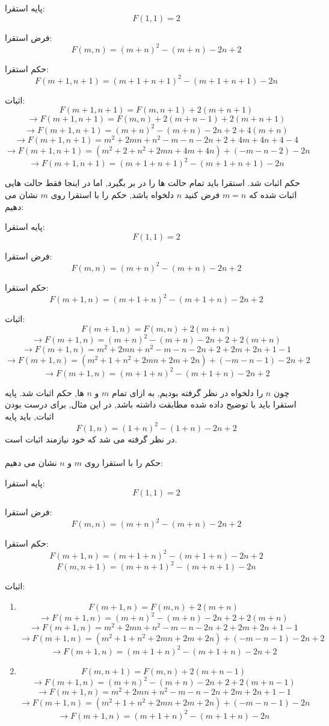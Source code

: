\documentclass[11pt,largemargins]{h2wp}
\begin{document}
پایه استقرا:
\[F(1,1)=2\]

فرض استقرا:
\[F(m,n)=(m+n)^2-(m+n)-2n+2\]

حکم استقرا:
\[F(m+1,n+1)=(m+1+n+1)^2-(m+1+n+1)-2n\]

اثبات:
\[F(m+1,n+1)=F(m,n+1)+2(m+n+1)\]
\[\rightarrow F(m+1,n+1)=F(m,n)+2(m+n-1)+2(m+n+1)\]
\[\rightarrow F(m+1,n+1)=(m+n)^2-(m+n)-2n+2+4(m+n)\]
\[\rightarrow F(m+1,n+1)=m^2+2mn+n^2-m-n-2n+2+4m+4n+4-4\]
\[\rightarrow F(m+1,n+1)=(m^2+2+n^2+2mn+4m+4n)+(-m-n-2)-2n\]
\[\rightarrow F(m+1,n+1)=(m+1+n+1)^2-(m+1+n+1)-2n\]

  حکم اثبات شد.
\notes
{}
استقرا باید تمام حالت ها را در بر بگیرد, اما در اینجا فقط حالت هایی اثبات شده که
$m=n$
\solution
فرض کنید $n$ دلخواه باشد, حکم را با استقرا روی $m$ نشان می دهیم:

پایه استقرا:
\[F(1,1)=2\]

فرض استقرا:
\[F(m,n)=(m+n)^2-(m+n)-2n+2\]

حکم استقرا:
\[F(m+1,n)=(m+1+n)^2-(m+1+n)-2n+2\]

اثبات:
\[F(m+1,n)=F(m,n)+2(m+n)\]
\[\rightarrow F(m+1,n)=(m+n)^2-(m+n)-2n+2+2(m+n)\]
\[\rightarrow F(m+1,n)=m^2+2mn+n^2-m-n-2n+2+2m+2n+1-1\]
\[\rightarrow F(m+1,n)=(m^2+1+n^2+2mn+2m+2n)+(-m-n-1)-2n+2\]
\[\rightarrow F(m+1,n)=(m+1+n)^2-(m+1+n)-2n+2\]

چون 
$n$
را دلخواه در نظر گرفته بودیم, به ازای تمام
$m$
و
$n$
  ها, حکم اثبات شد.
\notes
{}
پایه استقرا باید با توضیح داده شده مطابقت داشته باشد, در این مثال, برای درست بودن اثبات, باید پایه 
\[F(1,n)=(1+n)^2-(1+n)-2n+2\]
در نظر گرفته می شد که خود نیازمند اثبات است.
\\%
\\%
حکم را با استقرا روی $m$
و
$n$
 نشان می دهیم:

پایه استقرا:
\[F(1,1)=2\]

فرض استقرا:
\[F(m,n)=(m+n)^2-(m+n)-2n+2\]

حکم استقرا:
\[F(m+1,n)=(m+1+n)^2-(m+1+n)-2n+2\]
\[F(m,n+1)=(m+n+1)^2-(m+n+1)-2n\]

اثبات:
\begin{enumerate}

\item
\[F(m+1,n)=F(m,n)+2(m+n)\]
\[\rightarrow F(m+1,n)=(m+n)^2-(m+n)-2n+2+2(m+n)\]
\[\rightarrow F(m+1,n)=m^2+2mn+n^2-m-n-2n+2+2m+2n+1-1\]
\[\rightarrow F(m+1,n)=(m^2+1+n^2+2mn+2m+2n)+(-m-n-1)-2n+2\]
\[\rightarrow F(m+1,n)=(m+1+n)^2-(m+1+n)-2n+2\]
\item
\[F(m,n+1)=F(m,n)+2(m+n-1)\]
\[\rightarrow F(m+1,n)=(m+n)^2-(m+n)-2n+2+2(m+n-1)\]
\[\rightarrow F(m+1,n)=m^2+2mn+n^2-m-n-2n+2m+2n+1-1\]
\[\rightarrow F(m+1,n)=(m^2+1+n^2+2mn+2m+2n)+(-m-n-1)-2n\]
\[\rightarrow F(m+1,n)=(m+1+n)^2-(m+1+n)-2n\]
\end{enumerate}
\end{document}
